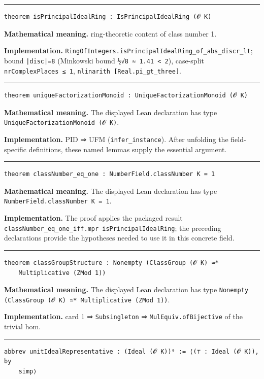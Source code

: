 \documentclass[UTF8,a4paper,11pt,fontset=fandol]{ctexart}
\theoremstyle{definition}
\newcommand{\statementsep}{\par\medskip\hrule\medskip}
\begin{document}
\statementsep
\begin{verbatim}
theorem isPrincipalIdealRing : IsPrincipalIdealRing (𝓞 K)
\end{verbatim}
\noindent\textbf{Mathematical meaning.} ring-theoretic content of class number 1.\par
\noindent\textbf{Implementation.} \texttt{RingOfIntegers.\allowbreak{}isPrincipalIdealRing\_\allowbreak{}of\_\allowbreak{}abs\_\allowbreak{}discr\_\allowbreak{}lt}; bound \texttt{|disc|=8} (Minkowski bound \texttt{½√8 ≈ 1.\allowbreak{}41 < 2}), case-split \texttt{nrComplexPlaces ≤ 1}, \texttt{nlinarith [Real.\allowbreak{}pi\_\allowbreak{}gt\_\allowbreak{}three]}.\par
\statementsep
\begin{verbatim}
theorem uniqueFactorizationMonoid : UniqueFactorizationMonoid (𝓞 K)
\end{verbatim}
\noindent\textbf{Mathematical meaning.} The displayed Lean declaration has type \texttt{UniqueFactorizationMonoid (𝓞 K)}.\par
\noindent\textbf{Implementation.} PID ⇒ UFM (\texttt{infer\_\allowbreak{}instance}). After unfolding the field-specific definitions, these named lemmas supply the essential argument.\par
\statementsep
\begin{verbatim}
theorem classNumber_eq_one : NumberField.classNumber K = 1
\end{verbatim}
\noindent\textbf{Mathematical meaning.} The displayed Lean declaration has type \texttt{NumberField.\allowbreak{}classNumber K = 1}.\par
\noindent\textbf{Implementation.} The proof applies the packaged result \texttt{classNumber\_\allowbreak{}eq\_\allowbreak{}one\_\allowbreak{}iff.\allowbreak{}mpr isPrincipalIdealRing}; the preceding declarations provide the hypotheses needed to use it in this concrete field.\par
\statementsep
\begin{verbatim}
theorem classGroupStructure : Nonempty (ClassGroup (𝓞 K) ≃*
    Multiplicative (ZMod 1))
\end{verbatim}
\noindent\textbf{Mathematical meaning.} The displayed Lean declaration has type \texttt{Nonempty (ClassGroup (𝓞 K) ≃* Multiplicative (ZMod 1))}.\par
\noindent\textbf{Implementation.} card 1 ⇒ \texttt{Subsingleton} ⇒ \texttt{MulEquiv.\allowbreak{}ofBijective} of the trivial hom.\par
\statementsep
\begin{verbatim}
abbrev unitIdealRepresentative : (Ideal (𝓞 K))⁰ := ⟨(⊤ : Ideal (𝓞 K)), by
    simp⟩
\end{verbatim}
\end{document}
